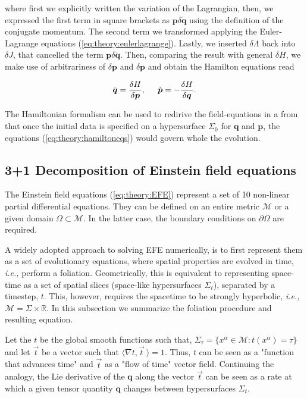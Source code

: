 \documentclass[11pt,a4paper,headinclude=true,DIV=14,BCOR=8mm,chapterprefix,listof=totoc,twoside,openright,abstracton]{scrbook}
\begin{document}
where first we explicitly written the variation of the Lagrangian, then, we expressed the first term in square brackets as  $\boldsymbol{p}\delta\dot{\boldsymbol{q}}$ using the definition of the conjugate momentum. The second term we transformed applying the Euler-Lagrange equations (\ref{eq:theory:eulerlagrange}). Lastly, we inserted $\delta\Lambda$ back into $\delta J$, that cancelled the term $\boldsymbol{p}\delta\dot{\boldsymbol{q}}$. Then, comparing the result with general $\delta H$, we make use of arbitrariness of  $\delta\boldsymbol{p}$ and $\delta\boldsymbol{p}$ and obtain the Hamilton equations read

\begin{equation}
\dot{\boldsymbol{q}}=\frac{\delta H}{\delta\boldsymbol{p}}, \hspace{5mm} \dot{\boldsymbol{p}} = -\frac{\delta H}{\delta\boldsymbol{q}}.
\label{eq:theory:hamiltoneqs}
\end{equation}

The Hamiltonian formalism can be used to redirive the field-equations in a from that once the initial data is specified on a hypersurface $\Sigma_0$ for $\boldsymbol{q}$ and $\boldsymbol{p}$, the equations (\ref{eq:theory:hamiltoneqs}) would govern whole the evolution.


\subsection{3+1 Decomposition of Einstein field equations}

The Einstein field equations (\ref{eq:theory:EFE}) represent a set of 10 non-linear partial differential equations. They can be defined on an entire metric $\mathcal{M}$ or a given domain $\Omega\subset\mathcal{M}$. In the latter case, the boundary conditions on $\partial\Omega$ are required. 

A widely adopted approach to solving EFE numerically, is to first represent them as a set of evolutionary equations, where spatial properties are evolved in time, \textit{i.e.,} perform a foliation. Geometrically, this is equivalent to representing space-time as a set of spatial slices (space-like hypersurfaces $\Sigma_t$), separated by a timestep, $t$.  This, however, requires the spacetime to be strongly hyperbolic, \textit{i.e.,} $\mathcal{M}=\Sigma\times\mathbb{R}$. In this subsection we summarize the foliation procedure and resulting equation. 

Let the $t$ be the global smooth functions such that, $ \Sigma_{\tau} = \{x^{\alpha}\in\mathcal{M}: t(x^{\alpha})=\tau\} $ and let $\vec{t}$ be a vector such that $\langle\nabla t, \vec{t}\:\rangle = 1$. Thus, $t$ can be seen as a "function that advances time" and $\vec{t}$ as a "flow of time" vector field. Continuing the analogy, the Lie derivative of the $\boldsymbol{q}$ along the vector $\vec{t}$ can be seen as a rate at which a given tensor quantity $\boldsymbol{q}$ changes between hypersurfaces $\Sigma_t$. 
\end{document}
